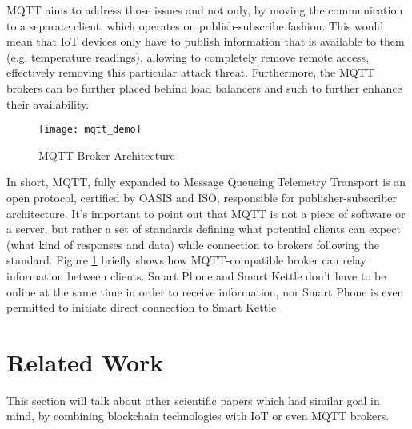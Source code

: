 MQTT aims to address those issues and not only, by moving the communication to a separate client, which operates on publish-subscribe fashion. This would mean that IoT devices only have to publish information that is available to them (e.g. temperature readings), allowing to completely remove remote access, effectively removing this particular attack threat. Furthermore, the MQTT brokers can be further placed behind load balancers and such to further enhance their availability.
\begin{figure}[h]
    \centering
    \texttt{[image: mqtt\_demo]}
    \caption{MQTT Broker Architecture}
    \label{fig:mqtt}
\end{figure}
In short, MQTT, fully expanded to Message Queueing Telemetry Transport is an open protocol, certified by OASIS and ISO\cite{banks2019mqtt}, responsible for publisher-subscriber architecture. It's important to point out that MQTT is not a piece of software or a server, but rather a set of standards defining what potential clients can expect (what kind of responses and data) while connection to brokers following the standard. Figure \ref{fig:mqtt} briefly shows how MQTT-compatible broker can relay information between clients. Smart Phone and Smart Kettle don't have to be online at the same time in order to receive information, nor Smart Phone is even permitted to initiate direct connection to Smart Kettle
\section{Related Work}
This section will talk about other scientific papers which had similar goal in mind, by combining  blockchain technologies with IoT or even MQTT brokers.

